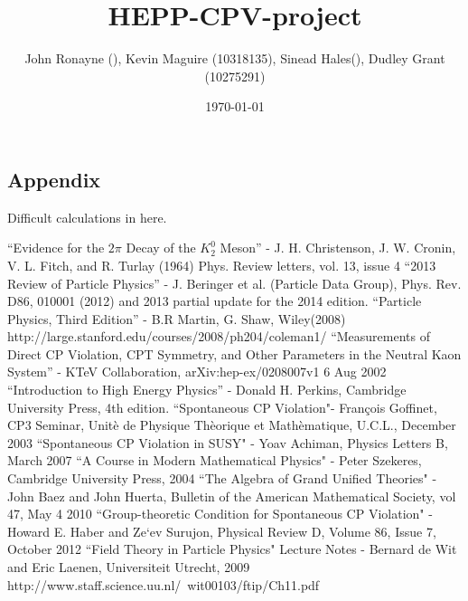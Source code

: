 \documentclass[floatfix,aps,prd,amsmath,amssymb]{revtex4}
\begin{document}
\title{HEPP-CPV-project}
\author{John Ronayne (), Kevin Maguire (10318135), Sinead Hales(), Dudley Grant (10275291)}
\date{\today}

\begin{abstract}
\textit{}
\end{abstract}

\maketitle
{}
 











\begin{appendix}
\section{Appendix}
Difficult calculations in here.
\end{appendix}
 
\begin{thebibliography}{10}
``Evidence for the $2 \pi$ Decay of the $K^0_2$ Meson'' - J. H. Christenson, J. W. Cronin, V. L. Fitch, and R. Turlay (1964) Phys. Review letters, vol. 13, issue 4
``2013 Review of Particle Physics'' - J. Beringer et al. (Particle Data Group), Phys. Rev. D86, 010001 (2012) and 2013 partial update for the 2014 edition.
``Particle Physics, Third Edition'' - B.R Martin, G. Shaw, Wiley(2008)  
http://large.stanford.edu/courses/2008/ph204/coleman1/  
``Measurements of Direct CP Violation, CPT Symmetry, and Other Parameters in the Neutral Kaon System'' - KTeV Collaboration, arXiv:hep-ex/0208007v1 6 Aug 2002
``Introduction to High Energy Physics'' - Donald H. Perkins, Cambridge University Press, 4th edition.
``Spontaneous CP Violation"- Fran\c{c}ois Goffinet, CP3 Seminar, Unit\`{e} de Physique Th\`{e}orique et Math\`{e}matique, U.C.L., December 2003
``Spontaneous CP Violation in SUSY" - Yoav Achiman, Physics Letters B, March 2007
``A Course in Modern Mathematical Physics" - Peter Szekeres, Cambridge University Press, 2004
``The Algebra of Grand Unified Theories" - John Baez and John Huerta, Bulletin of the American Mathematical Society, vol 47, May 4 2010
 ``Group-theoretic Condition for Spontaneous CP Violation" - Howard E. Haber and Ze`ev Surujon, Physical Review D, Volume 86, Issue 7, October 2012
 ``Field Theory in Particle Physics" Lecture Notes -  Bernard de Wit and Eric Laenen, Universiteit Utrecht, 2009 http://www.staff.science.uu.nl/~wit00103/ftip/Ch11.pdf


\end{thebibliography}
\end{document}
